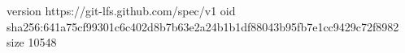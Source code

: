 version https://git-lfs.github.com/spec/v1
oid sha256:641a75cf99301c6c402d8b7b63e2a24b1b1df88043b95fb7e1cc9429c72f8982
size 10548

